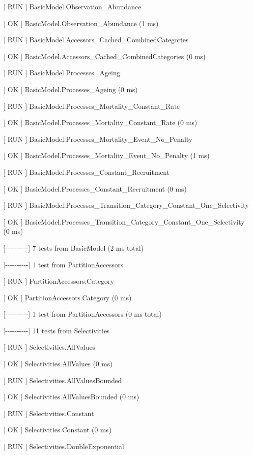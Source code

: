 \documentclass[a4paper,11pt,twoside,pdftex,draft]{article}
\begin{document}
{[} RUN {]} BasicModel.Observation\_Abundance

{[} OK {]} BasicModel.Observation\_Abundance (1 ms)

{[} RUN {]} BasicModel.Accessors\_Cached\_CombinedCategories

{[} OK {]} BasicModel.Accessors\_Cached\_CombinedCategories (0 ms)

{[} RUN {]} BasicModel.Processes\_Ageing

{[} OK {]} BasicModel.Processes\_Ageing (0 ms)

{[} RUN {]} BasicModel.Processes\_Mortality\_Constant\_Rate

{[} OK {]} BasicModel.Processes\_Mortality\_Constant\_Rate (0 ms)

{[} RUN {]} BasicModel.Processes\_Mortality\_Event\_No\_Penalty

{[} OK {]} BasicModel.Processes\_Mortality\_Event\_No\_Penalty (1 ms)

{[} RUN {]} BasicModel.Processes\_Constant\_Recruitment

{[} OK {]} BasicModel.Processes\_Constant\_Recruitment (0 ms)

{[} RUN {]}
BasicModel.Processes\_Transition\_Category\_Constant\_One\_Selectivity

{[} OK {]}
BasicModel.Processes\_Transition\_Category\_Constant\_One\_Selectivity
(0 ms)

{[}-\/-\/-\/-\/-\/-\/-\/-\/-\/-{]} 7 tests from BasicModel (2 ms total)

{[}-\/-\/-\/-\/-\/-\/-\/-\/-\/-{]} 1 test from PartitionAccessors

{[} RUN {]} PartitionAccessors.Category

{[} OK {]} PartitionAccessors.Category (0 ms)

{[}-\/-\/-\/-\/-\/-\/-\/-\/-\/-{]} 1 test from PartitionAccessors (0 ms
total)

{[}-\/-\/-\/-\/-\/-\/-\/-\/-\/-{]} 11 tests from Selectivities

{[} RUN {]} Selectivities.AllValues

{[} OK {]} Selectivities.AllValues (0 ms)

{[} RUN {]} Selectivities.AllValuesBounded

{[} OK {]} Selectivities.AllValuesBounded (0 ms)

{[} RUN {]} Selectivities.Constant

{[} OK {]} Selectivities.Constant (0 ms)

{[} RUN {]} Selectivities.DoubleExponential
\end{document}
